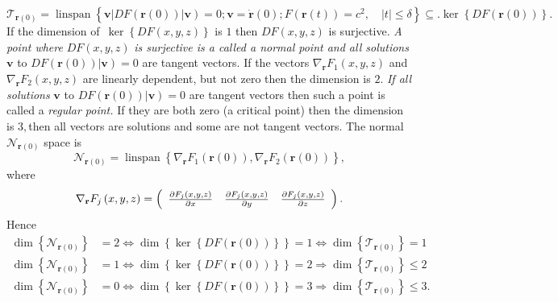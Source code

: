\documentclass[aps,preprint]{revtex4}%
\begin{document}
\begin{equation}
\mathcal{T}_{\mathbf{r}\left(  0\right)  }=\operatorname{linspan}\left\{
\left.  \overset{}{\mathbf{v}}\right\vert DF\left(  \mathbf{r}\left(
0\right)  \right)  \left\vert \mathbf{v}\right)  =0;\mathbf{v=\dot{r}}\left(
0\right)  ;F\left(  \mathbf{r}\left(  t\right)  \right)  =c^{2}\mathbf{,\quad
}\left\vert t\right\vert \leq\delta\right\}  \subseteq.\ker\left\{  DF\left(
\mathbf{r}\left(  0\right)  \right)  \right\}  .
\end{equation}
If the dimension of $\,\ker\left\{  DF\left(  x,y,z\right)  \right\}  $ is $1$
then $DF\left(  x,y,z\right)  $ is surjective. \emph{A point where }$DF\left(
x,y,z\right)  $\emph{ is surjective is a called a normal point and all
solutions }$\mathbf{v}$ to $DF\left(  \mathbf{r}\left(  0\right)  \right)
\left\vert \mathbf{v}\right)  =0$ are tangent vectors. \emph{ }If the vectors
$\nabla_{\mathbf{r}}F_{1}\left(  x,y,z\right)  $ and $\nabla_{\mathbf{r}}%
F_{2}\left(  x,y,z\right)  $ are linearly dependent, but not zero then the
dimension is $2.$ \emph{If all solutions }$\mathbf{v}$ to $DF\left(
\mathbf{r}\left(  0\right)  \right)  \left\vert \mathbf{v}\right)  =0$ are
tangent vectors then such a point is called a \emph{regular point. }If they
are both zero (a critical point) then the dimension is $3,$then all vectors
are solutions and some are not tangent vectors$.$ The normal $\mathcal{N}%
_{\mathbf{r}\left(  0\right)  }$ space is
\begin{equation}
\mathcal{N}_{\mathbf{r}\left(  0\right)  }=\operatorname{linspan}\left\{
\nabla_{\mathbf{r}}F_{1}\left(  \mathbf{r}\left(  0\right)  \right)
,\nabla_{\mathbf{r}}F_{2}\left(  \mathbf{r}\left(  0\right)  \right)
\right\}  ,
\end{equation}
where
\begin{equation}
\nabla_{\mathbf{r}}F_{j}\left(  x,y,z\right)  =\left(
\begin{array}
[c]{ccc}%
\frac{\partial F_{j}\left(  x,y,z\right)  }{\partial x} & \frac{\partial
F_{j}\left(  x,y,z\right)  }{\partial y} & \frac{\partial F_{j}\left(
x,y,z\right)  }{\partial z}%
\end{array}
\right)  .
\end{equation}
Hence
\begin{align}
\dim\left\{  \mathcal{N}_{\mathbf{r}\left(  0\right)  }\right\}   &
=2\Leftrightarrow\dim\left\{  \ker\left\{  DF\left(  \mathbf{r}\left(
0\right)  \right)  \right\}  \right\}  =1\Leftrightarrow\dim\left\{
\mathcal{T}_{\mathbf{r}\left(  0\right)  }\right\}  =1\\
\dim\left\{  \mathcal{N}_{\mathbf{r}\left(  0\right)  }\right\}   &
=1\Leftrightarrow\dim\left\{  \ker\left\{  DF\left(  \mathbf{r}\left(
0\right)  \right)  \right\}  \right\}  =2\Rightarrow\dim\left\{
\mathcal{T}_{\mathbf{r}\left(  0\right)  }\right\}  \leq2\\
\dim\left\{  \mathcal{N}_{\mathbf{r}\left(  0\right)  }\right\}   &
=0\Leftrightarrow\dim\left\{  \ker\left\{  DF\left(  \mathbf{r}\left(
0\right)  \right)  \right\}  \right\}  =3\Rightarrow\dim\left\{
\mathcal{T}_{\mathbf{r}\left(  0\right)  }\right\}  \leq3.
\end{align}
\end{document}

